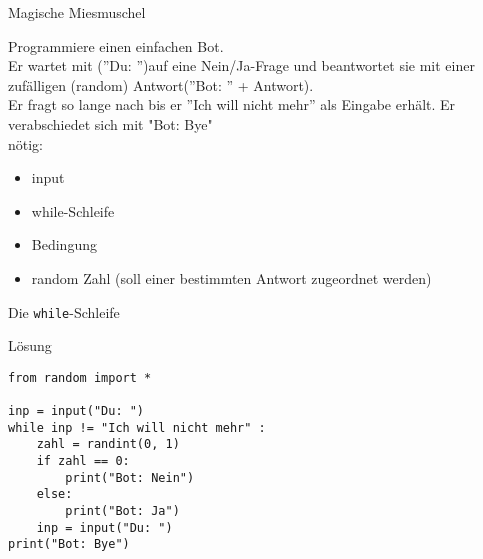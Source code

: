 \begin{frame}{Magische Miesmuschel}

	Programmiere einen einfachen Bot.\\ 
	Er wartet mit (''Du: '')auf eine Nein/Ja-Frage und beantwortet sie mit einer zufälligen (random) Antwort(''Bot: '' + Antwort). \\
	Er fragt so lange nach bis er ''Ich will nicht mehr'' als Eingabe erhält. Er verabschiedet sich mit "Bot: Bye"\\
	nötig:
	\begin{itemize}
		\item input
		\item while-Schleife
		\item Bedingung
		\item random Zahl (soll einer bestimmten Antwort zugeordnet werden)
	\end{itemize}		
\end{frame}

\begin{frame}[fragile]{Die \texttt{while}-Schleife}
\begin{exampleblock}{Lösung}
\begin{lstlisting}
from random import *

inp = input("Du: ")
while inp != "Ich will nicht mehr" :
	zahl = randint(0, 1)
	if zahl == 0:
		print("Bot: Nein")
	else:
		print("Bot: Ja")
	inp = input("Du: ")
print("Bot: Bye")
\end{lstlisting}
\end{exampleblock}
\end{frame}


